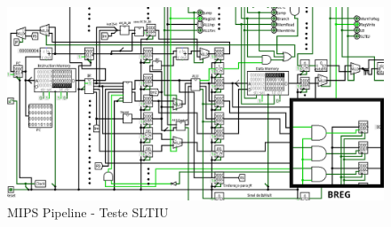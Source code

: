 \documentclass{report}
\begin{document}
        \begin{figure}[h!]
            \centering
            \includegraphics[width=\linewidth]{images/prints/Pipeline/Teste SLTIU.png}
            \caption{\label{print:pipeline_test_SLTIU} MIPS Pipeline - Teste SLTIU}
        \end{figure}
\end{document}
